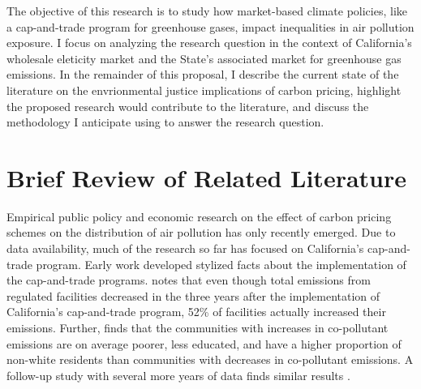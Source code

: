 \documentclass[11pt]{article}
\begin{document}

The objective of this research is to study how market-based climate policies, like a cap-and-trade program for greenhouse gases, impact inequalities in air pollution exposure. I focus on analyzing the research question in the context of California's wholesale eleticity market and the State's associated market for greenhouse gas emissions. In the remainder of this proposal, I describe the current state of the literature on the envrionmental justice implications of carbon pricing, highlight the proposed research would contribute to the literature, and discuss the methodology I anticipate using to answer the research question.


\section*{Brief Review of Related Literature}

Empirical public policy and economic research on the effect of carbon pricing schemes on the distribution of air pollution has only recently emerged. Due to data availability, much of the research so far has focused on California's cap-and-trade program. Early work developed stylized facts about the implementation of the cap-and-trade programs. \cite{cushing2018carbon} notes that even though total emissions from regulated facilities decreased in the three years after the implementation of California's cap-and-trade program, 52\% of facilities actually increased their emissions. Further, \cite{cushing2018carbon} finds that the communities with increases in co-pollutant emissions are on average poorer, less educated, and have a higher proportion of non-white residents than communities with decreases in co-pollutant emissions. A follow-up study with several more years of data finds similar results \citep{pastor2022up}. 
\end{document}
